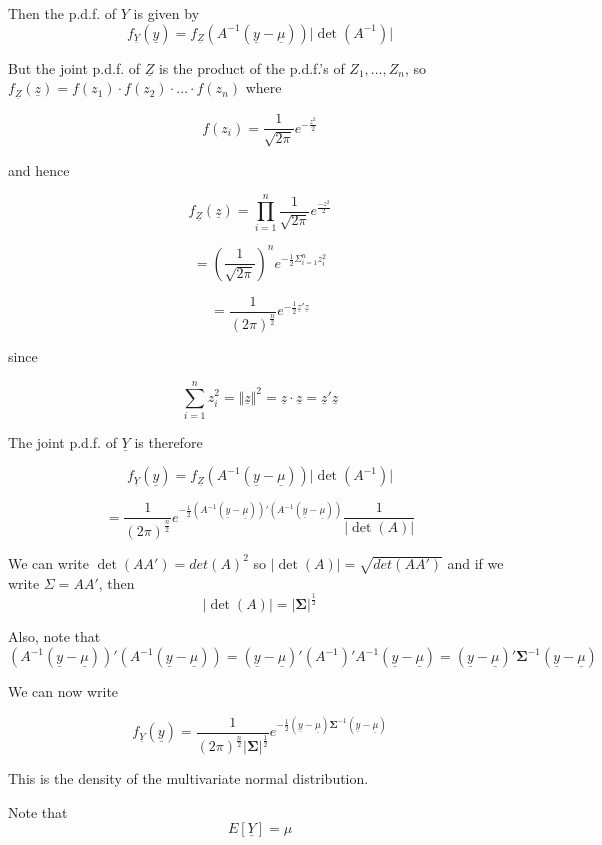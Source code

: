 \documentclass[12pt,a4paper]{article}
\theoremstyle{regla}
\theoremstyle{remark}
\theoremstyle{definition}
\theoremstyle{nonumberbreak}
\begin{document}
Then the p.d.f. of $Y$ is given by $$f_{\underline{Y}}(\underline{y})= f_{\underline{Z}}(A^{-1}(\underline{y}- \underline{\mu})) \vert \det(A^{-1}) \vert$$

But the joint p.d.f. of $\underline{Z}$ is the product of the p.d.f.'s of $Z_1, \ldots , Z_n$, so $f_{\underline{Z}}(\underline{z})= f(z_1) \cdot f(z_2) \cdot \ldots \cdot f(z_n)$ where

$$f(z_i) = \frac{1}{\sqrt{2 \pi}} e^{-\frac{z^2}{2}}$$

and hence

$$f_{\underline{Z}}(\underline{z}) = \prod_{i=1}^n \frac{1}{\sqrt{2 \pi}} e^{\frac{-z^2}{2}}$$

$$ = \left(\frac{1}{\sqrt{2 \pi}}\right)^n e^{-\frac{1}{2} \Sigma_{i=1}^n z_i^2}$$

$$=\frac{1}{(2 \pi)^\frac{n}{2}} e^{-\frac{1}{2} \underline{z}'\underline{z}}$$

since

$$\sum_{i=1}^n z_i^2 = \Vert \underline{z} \Vert ^2 = \underline{z} \cdot \underline{z} = \underline{z}'  \underline{z}$$

The joint p.d.f. of $\underline{Y}$ is therefore 

$$f_{\underline{Y}}(\underline{y}) = f_{\underline{Z}}(A^{-1}(\underline{y} - \underline{\mu})) \vert \det(A^{-1}) \vert $$

$$=\frac{1}{(2 \pi)^{\frac{n}{2}}} e^{-\frac{1}{2}(A^{-1}(\underline{y}-\underline{\mu}))'(A^{-1}(\underline{y}-\underline{\mu}))}\frac{1}{\vert \det(A)\vert}$$

We can write $\det(AA')=det(A)^2$ so $\vert \det(A)\vert = \sqrt{det(AA')}$ and if we write $\Sigma=AA'$, then 
$$\vert \det(A) \vert = \vert \boldsymbol{\Sigma} \vert ^\frac{1}{2}$$


Also, note that 
$$(A^{-1}(\underline{y}-\underline{\mu}))'(A^{-1}(\underline{y}-\underline{\mu})) = (\underline{y} - \underline{\mu})'(A^{-1})' A^{-1}(\underline{y} - \underline{\mu}) = (\underline{y} - \underline{\mu})' \boldsymbol{\Sigma}^{-1}(\underline{y}-\underline{\mu})$$

We can now write

$$f_{\underline{Y}}(\underline{y}) = \frac{1}{(2 \pi)^\frac{n}{2} \vert \boldsymbol{\Sigma} \vert ^{\frac{1}{2}}} e^{-\frac{1}{2} (\underline{y}-\underline{\mu}) \boldsymbol{\Sigma}^{-1} (\underline{y}-\underline{\mu})}$$

This is the density of the multivariate normal distribution.

Note that 
$$E[\underline{Y}] = \mu$$
\end{document}
